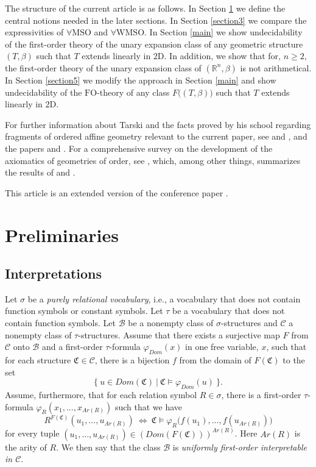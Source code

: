 \documentclass{LMCS}
\theoremstyle{plain}
\newcommand{\rp}{(\mathbb{R}^n,\beta)}
\newcommand{\mf}{\mathfrak}
\newcommand{\mi}{\mathit}
\begin{document}
%
The structure of the current article is as follows. In Section \ref{section2}
we define the central notions
needed in the later sections. In Section \ref{section3} we compare the
expressivities of $\forall\mathrm{MSO}$ and $\forall\mathrm{WMSO}$. 
In Section \ref{main} we show undecidability of the first-order theory of the unary expansion class of
any geometric structure $(T,\beta)$ such that $T$ extends  linearly in $\mathrm{2D}$. In addition, we show
that for, $n\geq 2$, the first-order theory of the unary expansion class of $\rp$ is
not arithmetical. In Section \ref{section5} we
modify the approach in Section \ref{main} and
show undecidability of the $\mathrm{FO}$-theory of any class
$F\bigl((T,\beta)\bigr)$ such that $T$ extends linearly in $\mathrm{2D}$.
%

For further information about 
Tarski and the facts proved by his school
regarding fragments of ordered affine geometry relevant to the current paper,
%
see \cite{schw} and \cite{TarskiGivant:1999},
%
and the papers \cite{prestel1} and \cite{prestel2}.
%
%
%
For a comprehensive survey on the development of the axiomatics of geometries of order, see \cite{pambuccian}, which, among other things, summarizes the results of
%
\cite{prestel1} and \cite{prestel2}.


%
This article is an extended version of the conference paper \cite{KMV:2012}. 
%
\section{Preliminaries}\label{section2}
%
\subsection{Interpretations}
%
Let $\sigma$ be a \emph{purely relational vocabulary}, i.e., a vocabulary that does not
%
contain function symbols or constant symbols.
%
Let $\tau$ be a vocabulary that does not contain function symbols.
%
Let $\mathcal{B}$ be a
%
nonempty class of $\sigma$-structures and  $\mathcal{C}$ a nonempty class of $\tau$-structures.
%
Assume that there exists a surjective map $F$ from $\mathcal{C}$ onto $\mathcal{B}$ and a
%
first-order $\tau$-formula $\varphi_{\mi{Dom}}(x)$ in one free variable, $x$,
%
such that for each structure $\mf{C}\in\mathcal{C}$, there is a bijection $f$ from the domain of $F(\mf{C})$ to the set
%
%
%
$$\{\ u\in \mi{Dom}(\mf{C})\ |\ \mf{C}\models\varphi_{\mi{Dom}}(u)\ \}.$$
%
%
%
Assume, furthermore, that for each relation symbol $R\in\sigma$, there is a first-order $\tau$-formula $\varphi_R(x_1,...,x_{\mi{Ar}(R)})$ such that
%
we have
%
%
%
$$R^{F(\mf{C})}(u_1,...,u_{\mi{Ar}(R)})\ \Leftrightarrow\ \mf{C}\models\varphi_R\bigl(f(u_1),...,f(u_{\mi{Ar}(R)})\bigr)$$
%
%
%
for every tuple $(u_1,...,u_{\mi{Ar}(R)})\in(\mi{Dom}(F(\mf{C})))^{\mi{Ar}(R)}$. Here $\mi{Ar}(R)$ is the arity of $R$.
%
We then say that the class $\mathcal{B}$ is \emph{uniformly first-order
%
interpretable in $\mathcal{C}$}. 
%
\end{document}
